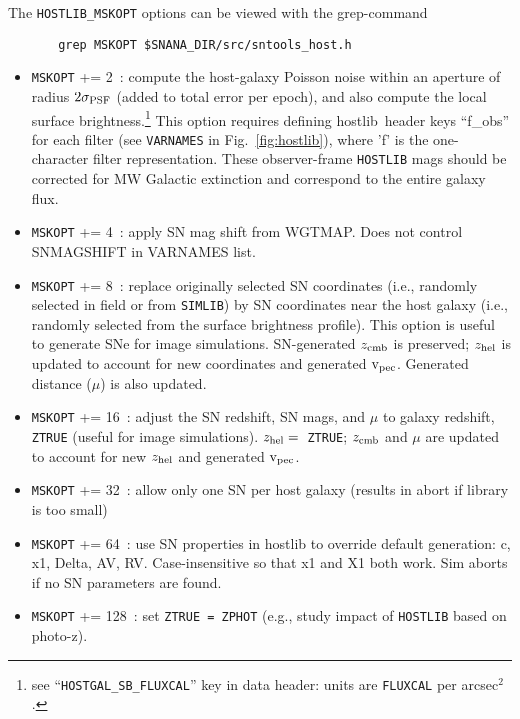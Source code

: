 \documentclass[12pt]{article}
\newcommand{\hostlib}{{\sc hostlib}}
\newcommand{\zhelio}{z_{\rm hel}}
\newcommand{\zcmb}{z_{\rm cmb}}
\newcommand{\vpec}{{\rm v}_{\rm pec}}
\begin{document}
{%
The {\tt HOSTLIB\_MSKOPT} options can be 
viewed with the grep-command
\begin{verbatim}
       grep MSKOPT $SNANA_DIR/src/sntools_host.h 
\end{verbatim}
%
\begin{itemize}
\item {\tt MSKOPT} += 2~: compute the host-galaxy Poisson noise within
       an aperture of radius $2\sigma_{\rm PSF}$ 
       (added to total error per epoch), and also compute
       the local surface brightness.\footnote{see 
         ``{\tt HOSTGAL\_SB\_FLUXCAL}'' key in data header: 
         units are {\tt FLUXCAL} per arcsec$^2$.}
       This option requires defining \hostlib\ header keys
       ``f\_obs'' for each filter 
       (see {\tt VARNAMES} in Fig.~\ref{fig:hostlib}), 
       where 'f' is the one-character filter representation.
       These observer-frame {\tt HOSTLIB} mags should be corrected for 
       MW Galactic extinction and correspond to the entire galaxy flux.
%
\item {\tt MSKOPT} += 4~: apply SN mag shift from WGTMAP.
      Does not control SNMAGSHIFT in VARNAMES list.
%
\item {\tt MSKOPT} += 8~: replace originally selected SN coordinates 
      (i.e., randomly selected in field or from {\tt SIMLIB})
      by SN coordinates near the host galaxy 
      (i.e., randomly selected from the surface brightness profile).
      This option is useful to generate SNe for image simulations.
      SN-generated $\zcmb$ is preserved; $\zhelio$ is updated to
      account for new coordinates and generated $\vpec$. 
      Generated distance ($\mu$) is also updated.
%
\item {\tt MSKOPT} += 16~: adjust the SN redshift, SN mags, and $\mu$ 
      to galaxy redshift, {\tt ZTRUE}  (useful for image simulations).
      $\zhelio=$~{\tt ZTRUE};  $\zcmb$ and $\mu$ are updated
      to account for new $\zhelio$ and generated $\vpec$.
%
\item {\tt MSKOPT} += 32~: allow only one SN per host galaxy 
                         (results in abort if library is too small)
%
\item {\tt MSKOPT} += 64~: 
  use SN properties in hostlib to override default generation:
  c, x1, Delta, AV, RV.
  Case-insensitive so that x1 and X1 both work.
  Sim aborts if no SN parameters are found.
%
\item {\tt MSKOPT} += 128~: set {\tt ZTRUE = ZPHOT} 
     (e.g., study impact of {\tt HOSTLIB} based on photo-z).

\end{itemize}}
\end{document}
